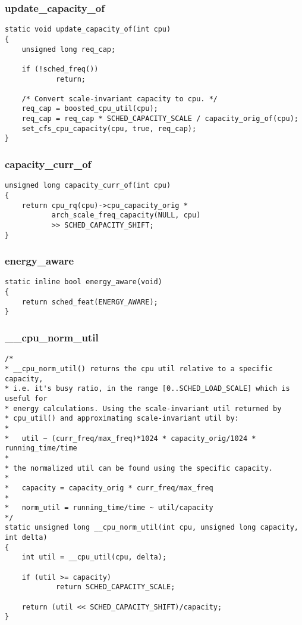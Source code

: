 \documentclass{article}
\begin{document}
\subsubsection{update\_capacity\_of}

\begin{verbatim}
static void update_capacity_of(int cpu)
{
    unsigned long req_cap;

    if (!sched_freq())
            return;

    /* Convert scale-invariant capacity to cpu. */
    req_cap = boosted_cpu_util(cpu);
    req_cap = req_cap * SCHED_CAPACITY_SCALE / capacity_orig_of(cpu);
    set_cfs_cpu_capacity(cpu, true, req_cap);
}
\end{verbatim}

\subsubsection{capacity\_curr\_of}

\begin{verbatim}
unsigned long capacity_curr_of(int cpu)
{
    return cpu_rq(cpu)->cpu_capacity_orig *
           arch_scale_freq_capacity(NULL, cpu)
           >> SCHED_CAPACITY_SHIFT;
}
\end{verbatim}

\subsubsection{energy\_aware}

\begin{verbatim}
static inline bool energy_aware(void)
{
    return sched_feat(ENERGY_AWARE);
}
\end{verbatim}

\subsubsection{\_\_cpu\_norm\_util}

\begin{verbatim}
/*
* __cpu_norm_util() returns the cpu util relative to a specific capacity,
* i.e. it's busy ratio, in the range [0..SCHED_LOAD_SCALE] which is useful for
* energy calculations. Using the scale-invariant util returned by
* cpu_util() and approximating scale-invariant util by:
*
*   util ~ (curr_freq/max_freq)*1024 * capacity_orig/1024 * running_time/time
*
* the normalized util can be found using the specific capacity.
*
*   capacity = capacity_orig * curr_freq/max_freq
*
*   norm_util = running_time/time ~ util/capacity
*/
static unsigned long __cpu_norm_util(int cpu, unsigned long capacity, int delta)
{
    int util = __cpu_util(cpu, delta);

    if (util >= capacity)
            return SCHED_CAPACITY_SCALE;

    return (util << SCHED_CAPACITY_SHIFT)/capacity;
}
\end{verbatim}
\end{document}
